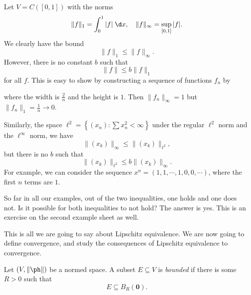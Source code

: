 \documentclass[a4paper]{article}
\begin{document}
\begin{eg}
  Let $V = C([0, 1])$ with the norms
  \[
    \|f\|_1 = \int_0^1 |f|\;\d x,\quad \|f\|_\infty = \sup_{[0, 1]}|f|.
  \]
  We clearly have the bound
  \[
    \|f\|_1 \leq \|f\|_\infty.
  \]
  However, there is no constant $b$ such that
  \[
    \|f\| \leq b\|f\|_1
  \]
  for all $f$. This is easy to show by constructing a sequence of functions $f_n$ by
  \begin{center}
  \end{center}
  where the width is $\frac{2}{n}$ and the height is $1$. Then $\|f_n\|_\infty = 1$ but $\|f_n\|_1 = \frac{1}{n} \to 0$.
\end{eg}
\begin{eg}
  Similarly, the space $\ell^2 = \left\{(x_n): \sum x_n^2 < \infty\right\}$ under the regular $\ell^2$ norm and the $\ell^\infty$ norm, we have
  \[
    \|(x_k)\|_\infty \leq \|(x_k)\|_{\ell^2},
  \]
  but there is no $b$ such that
  \[
    \|(x_k)\|_{\ell^2} \leq b\|(x_k)\|_\infty.
  \]
  For example, we can consider the sequence $x^n = (1, 1, \cdots, 1, 0, 0, \cdots)$, where the first $n$ terms are $1$.
\end{eg}
So far in all our examples, out of the two inequalities, one holds and one does not. Is it possible for both inequalities to not hold? The answer is yes. This is an exercise on the second example sheet as well.

This is all we are going to say about Lipschitz equivalence. We are now going to define convergence, and study the consequences of Lipschitz equivalence to convergence.
\begin{defi}
  Let $(V, \|\ph \|)$ be a normed space. A subset $E \subseteq V$ is \emph{bounded} if there is some $R > 0$ such that
  \[
    E \subseteq B_R(\mathbf{0}).
  \]
\end{defi}
\end{document}
